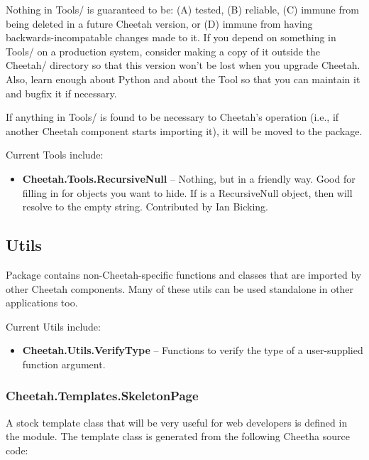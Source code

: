 Nothing in Tools/ is guaranteed to be: (A) tested, (B) reliable, (C) immune from
being deleted in a future Cheetah version, or (D) immune from having 
backwards-incompatable changes made to it.  If you depend on something in Tools/
on a production system, consider making a copy of it outside the Cheetah/
directory so that this version won't be lost when you upgrade Cheetah.  Also,
learn enough about Python and about the Tool so that you can maintain it and
bugfix it if necessary.

If anything in Tools/ is found to be necessary to Cheetah's operation (i.e., if
another Cheetah component starts importing it), it will be moved to the
 package.

Current Tools include:
\begin{itemize}
\item {\bf Cheetah.Tools.RecursiveNull} -- Nothing, but in a friendly way.  Good
     for filling in for objects you want to hide.  If  is a
     RecursiveNull object, then 
     will resolve to the empty string. Contributed by Ian Bicking.
\end{itemize}


\subsection{Utils}
\label{libraries.Utils}

Package  contains non-Cheetah-specific functions and
classes that are imported by other Cheetah components.  Many of these utils can
be used standalone in other applications too.  

Current Utils include:
\begin{itemize}
\item {\bf Cheetah.Utils.VerifyType} -- Functions to verify the type of a
     user-supplied function argument.
\end{itemize}

\subsubsection{Cheetah.Templates.SkeletonPage}
\label{libraries.templates.skeletonPage}

A stock template class that will be very useful for web developers is defined in
the  module.  The 
template class is generated from the following Cheetha source code:

